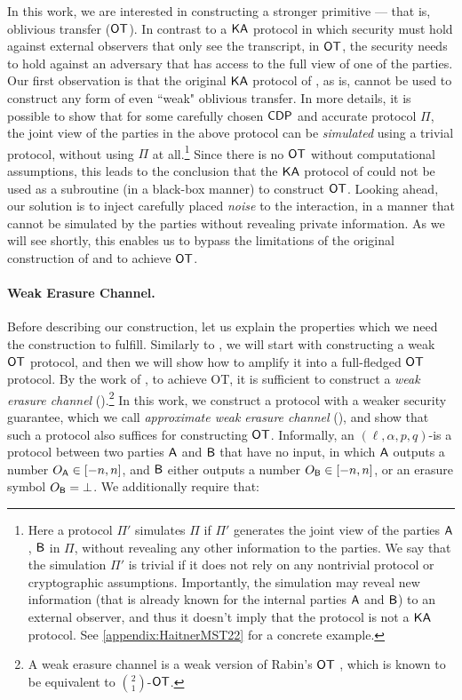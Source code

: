 In this work, we are interested in constructing a stronger primitive --- that is, oblivious transfer (${\sf OT}$). In contrast to a ${\sf KA}$ protocol in which security must hold against external observers that only see the transcript, in ${\sf OT}$, the security needs to hold against an adversary that has access to the full view of one of the parties. %
 Our first observation is that the original ${\sf KA}$ protocol of \cite{HaitnerMST22}, as is, 
cannot be used  to construct any form of even ``weak" oblivious transfer.
In more details, it is possible to show that for some carefully chosen ${\sf CDP}$ and accurate protocol  $\Pi$, the joint view of the parties in the above protocol can be \emph{simulated} using a trivial protocol, without using $\Pi$ at all.\footnote{Here a protocol $\Pi'$ simulates $\Pi$ if $\Pi'$ generates the joint view of the parties $\mathsf{A}$, $\mathsf{B}$ in $\Pi$, without revealing any other information to the parties. We say that the simulation $\Pi'$ is trivial if it does not rely on any nontrivial protocol or  cryptographic assumptions. Importantly, the simulation may reveal new information (that is already known for the internal parties $\mathsf{A}$ and $\mathsf{B}$) to an external observer, and thus it doesn't imply that the protocol is not a ${\sf KA}$ protocol. See \cref{appendix:HaitnerMST22} for a concrete example.}
Since there is no ${\sf OT}$ without computational assumptions, this leads to the conclusion that the ${\sf KA}$ protocol of \cite{HaitnerMST22} could not be used as a subroutine (in a black-box manner) to construct ${\sf OT}$. Looking ahead, our solution is to inject carefully placed \emph{noise} to the interaction, in a manner that cannot be simulated by the parties without revealing private information. As we will see shortly,  this enables us to bypass the limitations of the original construction of \cite{HaitnerMST22} and to achieve ${\sf OT}$.

\paragraph{Weak Erasure Channel.} Before describing our construction, let us explain the properties which we need the construction to fulfill. Similarly to \cite{HaitnerMST22}, we will start with constructing a weak ${\sf OT}$ protocol, and then we will show how to amplify it into a full-fledged ${\sf OT}$ protocol. By the work of \cite{Wullschleger09}, to achieve OT, it is sufficient to construct a \emph{weak erasure channel} (\WEC).\footnote{A weak erasure channel is a weak version of Rabin's ${\sf OT}$ \cite{Rabin81}, which is known to be equivalent to ${2 \choose 1}$-${\sf OT}$.} In this work, we construct a protocol with a weaker security guarantee, which we call \emph{approximate weak erasure channel} (\AWEC), and show that such a protocol also suffices for constructing ${\sf OT}$. Informally, an $(\ell,\alpha,p,q)$-\AWEC is a protocol between two parties $\mathsf{A}$ and $\mathsf{B}$ that have no input, in which $\mathsf{A}$ outputs a number $O_{\mathsf{A}}\in [-n,n]$, and $\mathsf{B}$ either outputs a number $O_{\mathsf{B}}\in [-n,n]$, or an erasure symbol $O_{\mathsf{B}}=\bot$. We additionally require that:


